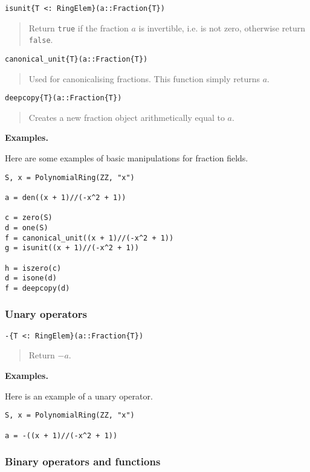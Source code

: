 \documentclass[a4paper,10pt]{article}
\newcommand{\code}{\lstinline}
\newcommand{\desc}[1]{\vspace{-3mm}\begin{quote}#1\end{quote}}
\begin{document}
\begin{lstlisting}
isunit{T <: RingElem}(a::Fraction{T})
\end{lstlisting}

\desc{Return \code{true} if the fraction $a$ is invertible, i.e. is not zero,
otherwise return \code{false}.}

\begin{lstlisting}
canonical_unit{T}(a::Fraction{T})
\end{lstlisting}

\desc{Used for canonicalising fractions. This function simply returns $a$.}

\begin{lstlisting}
deepcopy{T}(a::Fraction{T})
\end{lstlisting}

\desc{Creates a new fraction object arithmetically equal to $a$.}

\textbf{Examples.}

Here are some examples of basic manipulations for fraction fields.

\begin{lstlisting}
S, x = PolynomialRing(ZZ, "x")

a = den((x + 1)//(-x^2 + 1))

c = zero(S)
d = one(S)
f = canonical_unit((x + 1)//(-x^2 + 1))
g = isunit((x + 1)//(-x^2 + 1))

h = iszero(c)
d = isone(d)
f = deepcopy(d)
\end{lstlisting}

\subsubsection{Unary operators}

\begin{lstlisting}
-{T <: RingElem}(a::Fraction{T})
\end{lstlisting}

\desc{Return $-a$.}

\textbf{Examples.}

Here is an example of a unary operator.

\begin{lstlisting}
S, x = PolynomialRing(ZZ, "x")

a = -((x + 1)//(-x^2 + 1))
\end{lstlisting}

\subsubsection{Binary operators and functions}
\end{document}
